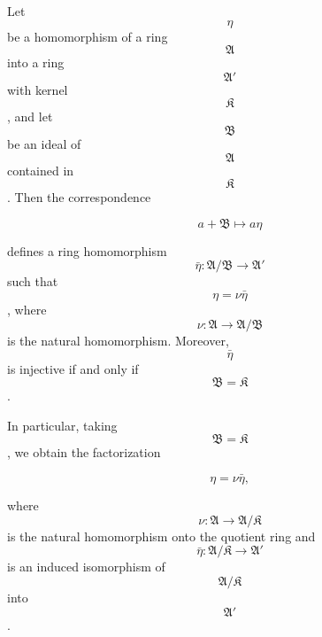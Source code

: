 Let $$\eta$$ be a homomorphism of a ring $$\mathfrak{A}$$ into a ring $$\mathfrak{A}'$$ with kernel $$\mathfrak{K}$$, and let $$\mathfrak{B}$$ be an ideal of $$\mathfrak{A}$$ contained in $$\mathfrak{K}$$. Then the correspondence

$$a + \mathfrak{B} \mapsto a\eta$$

defines a ring homomorphism $$\bar{\eta}: \mathfrak{A}/\mathfrak{B} \to \mathfrak{A}'$$ such that $$\eta = \nu \bar{\eta}$$, where $$\nu: \mathfrak{A} \to \mathfrak{A}/\mathfrak{B}$$ is the natural homomorphism. Moreover, $$\bar{\eta}$$ is injective if and only if $$\mathfrak{B} = \mathfrak{K}$$.

In particular, taking $$\mathfrak{B} = \mathfrak{K}$$, we obtain the factorization

$$\eta = \nu \bar{\eta},$$

where $$\nu: \mathfrak{A} \to \mathfrak{A}/\mathfrak{K}$$ is the natural homomorphism onto the quotient ring and $$\bar{\eta}: \mathfrak{A}/\mathfrak{K} \to \mathfrak{A}'$$ is an induced isomorphism of $$\mathfrak{A}/\mathfrak{K}$$ into $$\mathfrak{A}'$$.
